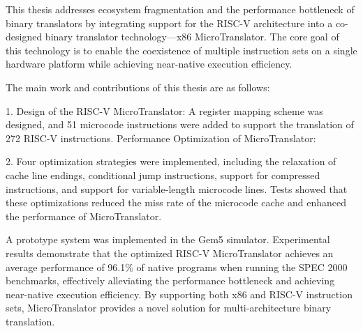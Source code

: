 This thesis addresses ecosystem fragmentation and the performance bottleneck of binary translators by integrating support for the RISC-V architecture into a co-designed binary translator technology—x86 MicroTranslator. The core goal of this technology is to enable the coexistence of multiple instruction sets on a single hardware platform while achieving near-native execution efficiency.

The main work and contributions of this thesis are as follows:

1. Design of the RISC-V MicroTranslator:
A register mapping scheme was designed, and 51 microcode instructions were added to support the translation of 272 RISC-V instructions.
Performance Optimization of MicroTranslator:

2. Four optimization strategies were implemented, including the relaxation of cache line endings, conditional jump instructions, support for compressed instructions, and support for variable-length microcode lines. Tests showed that these optimizations reduced the miss rate of the microcode cache and enhanced the performance of MicroTranslator.

A prototype system was implemented in the Gem5 simulator. Experimental results demonstrate that the optimized RISC-V MicroTranslator achieves an average performance of 96.1\% of native programs when running the SPEC 2000 benchmarks, effectively alleviating the performance bottleneck and achieving near-native execution efficiency. By supporting both x86 and RISC-V instruction sets, MicroTranslator provides a novel solution for multi-architecture binary translation.


\pagestyle{enfrontmatterstyle}%
\cleardoublepage\pagestyle{frontmatterstyle}%

